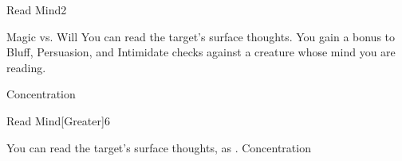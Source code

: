 \begin{spellsection}{Read Mind}{2}
    \begin{spellheader}
    \end{spellheader}
    \begin{spellcontent}
        \begin{spelltargetinginfo}
        \end{spelltargetinginfo}
        \begin{spelleffects}
            \begin{spellattack}{Magic vs. Will}
                \spellsuccess You can read the target's surface thoughts. You gain a  bonus to Bluff, Persuasion, and Intimidate checks against a creature whose mind you are reading.
            \end{spellattack}
            \spelldur Concentration
        \end{spelleffects}
    \end{spellcontent}
    \begin{spellfooter}
        \miscastrandom
    \end{spellfooter}
\end{spellsection}

\begin{spellsection}{Read Mind}[Greater]{6}
    \begin{spellheader}
    \end{spellheader}
    \begin{spellcontent}
        \begin{spelltargetinginfo}
        \end{spelltargetinginfo}
        \begin{spelleffects}
            \spelleffect You can read the target's surface thoughts, as .
            \spelldur Concentration
        \end{spelleffects}
    \end{spellcontent}
    \begin{spellfooter}
        \miscastrandom
    \end{spellfooter}
\end{spellsection}

